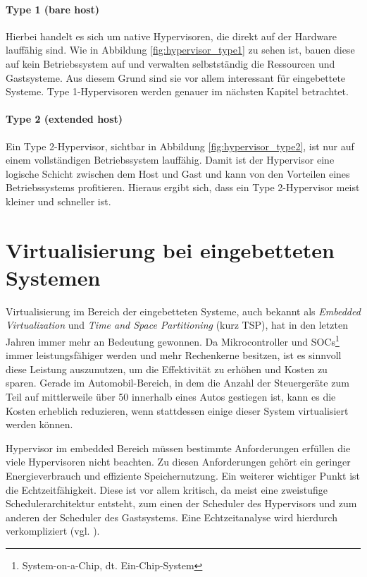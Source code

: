 \documentclass[
  a4paper,					    %
  twoside,
  DIV=calc,     				%
  bibliography=totoc,
  cleardoublepage=empty,
  ngerman,     					%
  final       					%
]{scrbook}
\begin{document}
\paragraph{Type 1 (bare host)} Hierbei handelt es sich um native Hypervisoren, die direkt auf der Hardware lauffähig sind. Wie in Abbildung \ref{fig:hypervisor_type1} zu sehen ist, bauen diese auf kein Betriebssystem auf und verwalten selbstständig die Ressourcen und Gastsysteme. Aus diesem Grund sind sie vor allem interessant für eingebettete Systeme. Type 1-Hypervisoren werden genauer im nächsten Kapitel betrachtet.

\paragraph{Type 2 (extended host)} Ein Type 2-Hypervisor, sichtbar in Abbildung \ref{fig:hypervisor_type2}, ist nur auf einem vollständigen Betriebssystem lauffähig. Damit ist der Hypervisor eine logische Schicht zwischen dem Host und Gast und kann von den Vorteilen eines Betriebssystems profitieren. Hieraus ergibt sich, dass ein Type 2-Hypervisor meist kleiner und schneller ist.





\section{Virtualisierung bei eingebetteten Systemen}
\label{sec:EVirtualisierung}
Virtualisierung im Bereich der eingebetteten Systeme, auch bekannt als \emph{Embedded Virtualization} und \emph{Time and Space Partitioning} (kurz TSP), hat in den letzten Jahren immer mehr an Bedeutung gewonnen. Da Mikrocontroller und SOCs\footnote{System-on-a-Chip, dt. Ein-Chip-System} immer leistungsfähiger werden und mehr Rechenkerne besitzen, ist es sinnvoll diese Leistung auszunutzen, um die Effektivität zu erhöhen und Kosten zu sparen. Gerade im Automobil-Bereich, in dem die Anzahl der Steuergeräte zum Teil auf mittlerweile über 50 innerhalb eines Autos gestiegen ist, kann es die Kosten erheblich reduzieren, wenn stattdessen einige dieser System virtualisiert werden können.

Hypervisor im embedded Bereich müssen bestimmte Anforderungen erfüllen die viele Hypervisoren nicht beachten. Zu diesen Anforderungen gehört ein geringer Energieverbrauch und effiziente Speichernutzung. Ein weiterer wichtiger Punkt ist die Echtzeitfähigkeit. Diese ist vor allem kritisch, da meist eine zweistufige Schedulerarchitektur entsteht, zum einen der Scheduler des Hypervisors und zum anderen der Scheduler des Gastsystems. Eine Echtzeitanalyse wird hierdurch verkompliziert (vgl. \cite{two_lvl_sched}).
\end{document}
